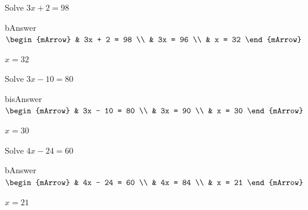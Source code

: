 \begin{mtask}
   \task \begin{exercise} Solve  $ 3x+ 2 = 98 $
           \begin{envOut}[height=5cm]{bAnswer}
             $\begin{mArrow} 
			       & 3x + 2 = 98             \\
                   & 3x = 96                  \\
				   & x = 32
              \end{mArrow}$
            \begin{shortsolution}  
			     $x=32$
			\end{shortsolution}				 
           \end{envOut}
         \end{exercise}
		 
   \task \begin{exercise} Solve  $ 3x - 10 = 80 $
           \begin{envOut}[height=5cm]{bisAnswer}
             $\begin{mArrow} 
			       & 3x - 10 = 80             \\
                   & 3x = 90                  \\
				   & x = 30
              \end{mArrow}$
            \begin{shortsolution}  
			     $x=30$
			\end{shortsolution}				 
           \end{envOut}
         \end{exercise}

   \task \begin{exercise} Solve  $ 4x - 24 = 60 $
           \begin{envOut}[height=5cm]{bAnswer}
             $\begin{mArrow} 
			       & 4x - 24 = 60             \\
                   & 4x = 84                  \\
				   & x = 21   
              \end{mArrow}$
            \begin{shortsolution}  
			     $x=21$
			\end{shortsolution}				 
           \end{envOut}
         \end{exercise}
		 
		 
\end{mtask}


